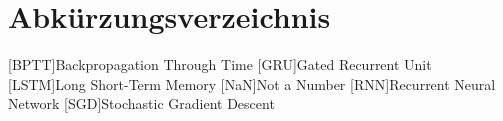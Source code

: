 \clearpage
\chapter*{Abkürzungsverzeichnis}	

\begin{acronym}[XXXXXXX]
	[BPTT]{Backpropagation Through Time}
	[GRU]{Gated Recurrent Unit}
	[LSTM]{Long Short-Term Memory}
	[NaN]{Not a Number}
	[RNN]{Recurrent Neural Network}
	[SGD]{Stochastic Gradient Descent}
\end{acronym}
